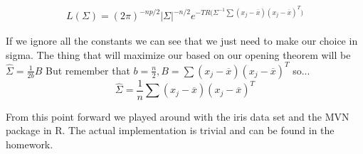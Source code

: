 \begin{gather*}
    L(\Sigma) = (2\pi)^{-np/2}|\Sigma|^{-n/2}e^{-
    TR \big(\Sigma^{-1} \sum(x_j-\overline{x})(x_j-\overline{x})^T \big)
    }
\end{gather*}

If we ignore all the constants we can see that we just need to make our choice in sigma. The thing that will maximize our based on our opening theorem will be 
$\hat \Sigma = \frac{1}{2b}B$
But remember that $b=\frac{n}{2},B=\sum(x_j-\overline{x})(x_j-\overline{x})^T$ so...
\begin{equation}
    \hat\Sigma = \frac{1}{n}\sum(x_j-\overline{x})(x_j-\overline{x})^T
\end{equation}

From this point forward we played around with the iris data set and the MVN package in R. The actual implementation is trivial and can be found in the homework.